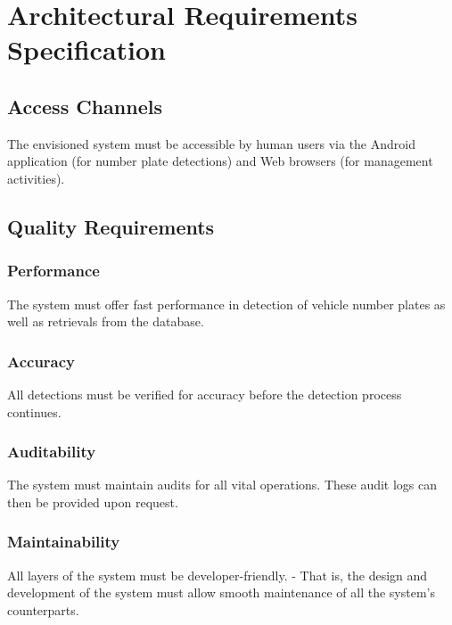 \documentclass[12pt]{article}
\begin{document}
                \section{Architectural Requirements Specification}
                		\subsection{Access Channels }
                				The envisioned system must be accessible by human users via the Android application (for number plate detections) and Web browsers (for management activities).
                			
                		\subsection{Quality Requirements}
                		
                				\subsubsection{Performance}
		   			                  	The system must offer fast performance in detection of vehicle number plates as well as retrievals from the database. 
		   			                  	
                			    \subsubsection{Accuracy}
                			    		All detections must be verified for accuracy before the detection process continues.
                			    		             	
                				\subsubsection{Auditability}
		   			                   	The system must maintain audits for all vital operations. These audit logs can then be provided upon request. 
		       			                  	
               					\subsubsection{Maintainability}
					                  	All layers of the system must be developer-friendly. - That is, the design and development of the system must allow smooth maintenance of all the system's counterparts.
       						    
\end{document}
